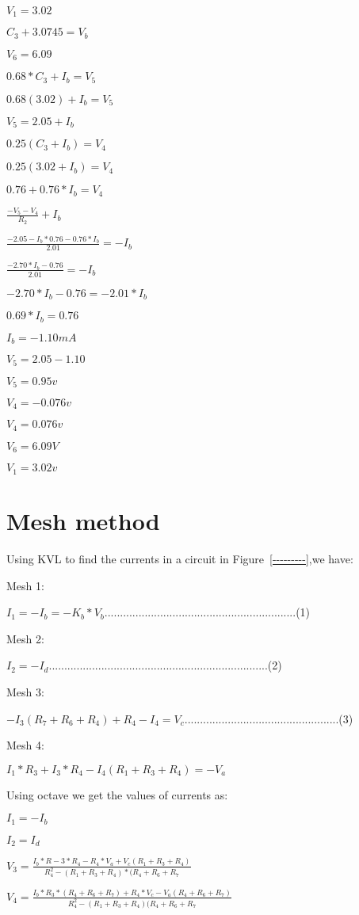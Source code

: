 $V_1=3.02$

$C_3+3.0745=V_b$

$V_6=6.09$

$0.68*C_3+I_b=V_5$

$0.68(3.02)+I_b=V_5$

$V_5=2.05+I_b$

$0.25(C_3+I_b)=V_4$

$0.25(3.02+I_b)=V_4$

$0.76+0.76*I_b=V_4$

$\frac{-V_5-V_4}{R_2}+I_b$

$\frac{-2.05-I_b*0.76-0.76*I_b}{2.01}=-I_b$

$\frac{-2.70*I_b-0.76}{2.01}=-I_b$

$-2.70*I_b-0.76=-2.01*I_b$

$0.69*I_b=0.76$

$I_b=-1.10mA$

$V_5=2.05-1.10$

$V_5=0.95v$

$V_4=-0.076v$

$V_4=0.076v$

$V_6=6.09V$

$V_1=3.02v$


\section{Mesh method}

Using KVL to find the currents in a circuit in Figure~\ref{---------},we have:

Mesh 1:

$I_1=-I_b=-K_b*V_b$..............................................................(1)

Mesh 2:

$I_2=-I_d$.......................................................................(2)

Mesh 3:

$-I_3(R_7+R_6+R_4)+R_4-I_4=V_c$..................................................(3)

Mesh 4:

$I_1*R_3+I_3*R_4-I_4(R_1+R_3+R_4)=-V_a$

Using octave we get the values of currents as:

$I_1=-I_b$

$I_2=I_d$

$V_3=\frac{I_b*R-3*R_4-R_4*V_a+V_c(R_1+R_3+R_4)}{R_4^2-(R_1+R_3+R_4)*(R_4+R_6+R_7}$

$V_4=\frac{I_b*R_3*(R_4+R_6+R_7)+R_4*V_c-V_a(R_4+R_6+R_7)}{R_4^2-(R_1+R_3+R_4)(R_4+R_6+R_7}$


